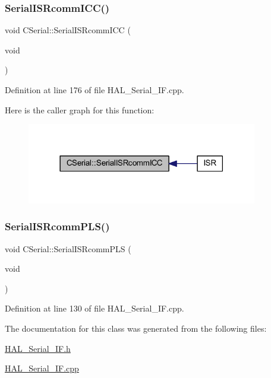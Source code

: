 \subsubsection{\texorpdfstring{Serial\+I\+S\+Rcomm\+I\+C\+C()}{SerialISRcommICC()}}
{\footnotesize\ttfamily void C\+Serial\+::\+Serial\+I\+S\+Rcomm\+I\+CC (\begin{DoxyParamCaption}\item[{void}]{ }\end{DoxyParamCaption})}



Definition at line 176 of file H\+A\+L\+\_\+\+Serial\+\_\+\+I\+F.\+cpp.

Here is the caller graph for this function\+:
\nopagebreak
\begin{figure}[H]
\begin{center}
\leavevmode
\includegraphics[width=285pt]{class_c_serial_a974812db5ced18cb9a6a73dc9034e7c8_icgraph}
\end{center}
\end{figure}
\mbox{\label{class_c_serial_a707841754d94fc1ab6679f52bf413d85}} 
\subsubsection{\texorpdfstring{Serial\+I\+S\+Rcomm\+P\+L\+S()}{SerialISRcommPLS()}}
{\footnotesize\ttfamily void C\+Serial\+::\+Serial\+I\+S\+Rcomm\+P\+LS (\begin{DoxyParamCaption}\item[{void}]{ }\end{DoxyParamCaption})}



Definition at line 130 of file H\+A\+L\+\_\+\+Serial\+\_\+\+I\+F.\+cpp.



The documentation for this class was generated from the following files\+:\begin{DoxyCompactItemize}
\item 
\mbox{\hyperlink{_h_a_l___serial___i_f_8h}{H\+A\+L\+\_\+\+Serial\+\_\+\+I\+F.\+h}}\item 
\mbox{\hyperlink{_h_a_l___serial___i_f_8cpp}{H\+A\+L\+\_\+\+Serial\+\_\+\+I\+F.\+cpp}}\end{DoxyCompactItemize}

